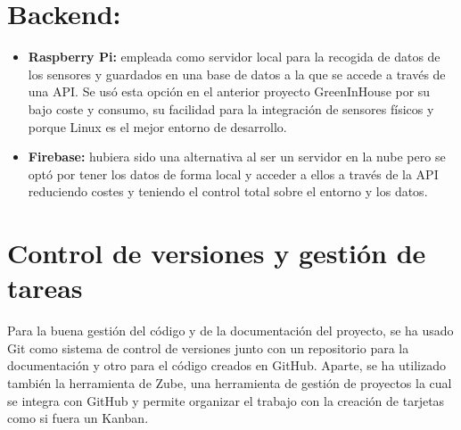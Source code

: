 \section{Backend:}
\begin{itemize}
    \item \textbf{Raspberry Pi:} empleada como servidor local para la recogida de datos de los sensores y guardados en una base de datos a la que se accede a través de una API.
    Se usó esta opción en el anterior proyecto GreenInHouse por su bajo coste y consumo, su facilidad para la integración de sensores físicos y porque Linux es el mejor entorno de desarrollo.

    \item \textbf{Firebase:} hubiera sido una alternativa al ser un servidor en la nube pero se optó por tener los datos de forma local y acceder a ellos a través de la API reduciendo costes y teniendo el control total sobre el entorno y los datos.
\end{itemize}

\section{Control de versiones y gestión de tareas}

Para la buena gestión del código y de la documentación del proyecto, se ha usado Git como sistema de control de versiones junto con un repositorio para la documentación y otro para el código creados en GitHub. Aparte, se ha utilizado también la herramienta de Zube, una herramienta de gestión de proyectos la cual se integra con GitHub y permite organizar el trabajo con la creación de tarjetas como si fuera un Kanban.

